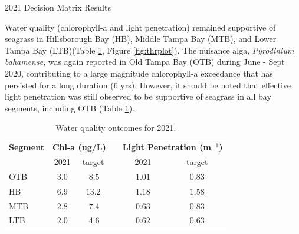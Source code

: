 \documentclass[final,t]{beamer}\usepackage[]{graphicx}\usepackage[]{color}
\begin{document}
\begin{frame}
\begin{columns}[t]
\begin{column}{.79\linewidth}
\begin{block}{2021 Decision Matrix Results}
\vspace{-0.1in}
\begin{minipage}{0.45\textwidth}
\footnotesize
Water quality (chlorophyll-a and light penetration) remained supportive of seagrass in Hillsborough Bay (HB), Middle Tampa Bay (MTB), and Lower Tampa Bay (LTB)(Table \ref{tab:segtab}, Figure \ref{fig:thrplot}). The nuisance alga, \textit{Pyrodinium bahamense}, was again reported in Old Tampa Bay (OTB) during June - Sept 2020, contributing to a large magnitude chlorophyll-a exceedance that has persisted for a long duration (6 yrs). However, it should be noted that effective light penetration was still observed to be supportive of seagrass in all bay segments, including OTB (Table \ref{tab:segtab}).
\end{minipage}
\hspace{0.1in}
\begin{minipage}{0.5\textwidth}
\footnotesize
\begin{table}[!tbp]
\caption{{\footnotesize Water quality outcomes for 2021.}\label{tab:segtab}} 
\begin{center}
\begin{tabular}{lccccc}
\hline\hline
\multicolumn{1}{l}{\bfseries Segment}&\multicolumn{2}{c}{\bfseries Chl-a (ug/L)}&\multicolumn{1}{c}{\bfseries }&\multicolumn{2}{c}{\bfseries Light Penetration (m$^{-1}$)}\tabularnewline
\cline{2-3} \cline{5-6}
\multicolumn{1}{l}{}&\multicolumn{1}{c}{2021}&\multicolumn{1}{c}{target}&\multicolumn{1}{c}{}&\multicolumn{1}{c}{2021}&\multicolumn{1}{c}{target}\tabularnewline
\hline
\cellcolor{yellow}OTB&$3.0$&$~8.5$&&$1.01$&$0.83$\tabularnewline
\cellcolor{green}HB&$6.9$&$13.2$&&$1.18$&$1.58$\tabularnewline
\cellcolor{green}MTB&$2.8$&$~7.4$&&$0.63$&$0.83$\tabularnewline
\cellcolor{green}LTB&$2.0$&$~4.6$&&$0.62$&$0.63$\tabularnewline
\hline
\end{tabular}\end{center}
\end{table}

\end{minipage}

\end{block}

\vspace{-0.55in}


\end{column}
\end{columns}
\end{frame}
\end{document}
